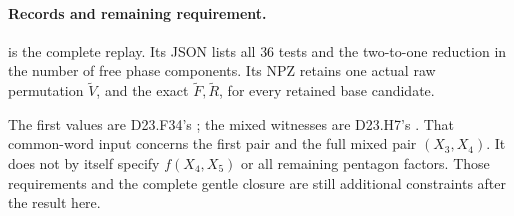 \paragraph{Records and remaining requirement.}
 is the
complete replay. Its JSON lists all 36 tests and the
two-to-one reduction in the number of free phase
components. Its NPZ retains one actual raw permutation
$\widetilde V$, and the exact $\widetilde F,\widetilde R$,
for every retained base candidate.

The first values are D23.F34's
;
the mixed witnesses are D23.H7's
.
That common-word input concerns the first pair and the
full mixed pair $(X_3,X_4)$. It does not by itself
specify $f(X_4,X_5)$ or all remaining pentagon factors.
Those requirements and the complete gentle closure are
still additional constraints after the result here.

